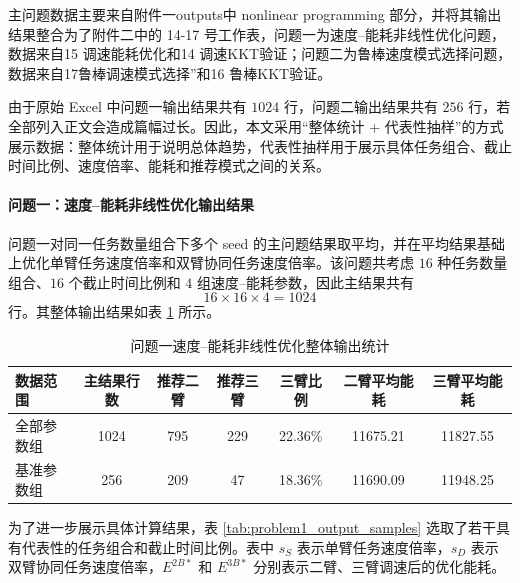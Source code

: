 主问题数据主要来自附件一outputs中 nonlinear programming 部分，并将其输出结果整合为了附件二中的 14-17 号工作表，问题一为速度--能耗非线性优化问题，数据来自15 调速能耗优化和14 调速KKT验证；问题二为鲁棒速度模式选择问题，数据来自17鲁棒调速模式选择”和16 鲁棒KKT验证。

由于原始 Excel 中问题一输出结果共有 $1024$ 行，问题二输出结果共有 $256$ 行，若全部列入正文会造成篇幅过长。因此，本文采用“整体统计 + 代表性抽样”的方式展示数据：整体统计用于说明总体趋势，代表性抽样用于展示具体任务组合、截止时间比例、速度倍率、能耗和推荐模式之间的关系。

\paragraph{问题一：速度--能耗非线性优化输出结果}

问题一对同一任务数量组合下多个 seed 的主问题结果取平均，并在平均结果基础上优化单臂任务速度倍率和双臂协同任务速度倍率。该问题共考虑 $16$ 种任务数量组合、$16$ 个截止时间比例和 $4$ 组速度--能耗参数，因此主结果共有
\[
16\times 16\times 4=1024
\]
行。其整体输出结果如表 \ref{tab:problem1_output_overall} 所示。

\begin{table}[H]
	\centering
	\caption{问题一速度--能耗非线性优化整体输出统计}
	\label{tab:problem1_output_overall}
	\footnotesize
	\setlength{\tabcolsep}{4pt}
	\begin{tabular}{lcccccc}
		\hline
		数据范围 & 主结果行数 & 推荐二臂 & 推荐三臂 & 三臂比例 & 二臂平均能耗 & 三臂平均能耗 \\
		\hline
		全部参数组 & 1024 & 795 & 229 & 22.36\% & 11675.21 & 11827.55 \\
		基准参数组 & 256 & 209 & 47 & 18.36\% & 11690.09 & 11948.25 \\
		\hline
	\end{tabular}
\end{table}

为了进一步展示具体计算结果，表 \ref{tab:problem1_output_samples} 选取了若干具有代表性的任务组合和截止时间比例。表中 $s_S$ 表示单臂任务速度倍率，$s_D$ 表示双臂协同任务速度倍率，$E^{2B*}$ 和 $E^{3B*}$ 分别表示二臂、三臂调速后的优化能耗。

